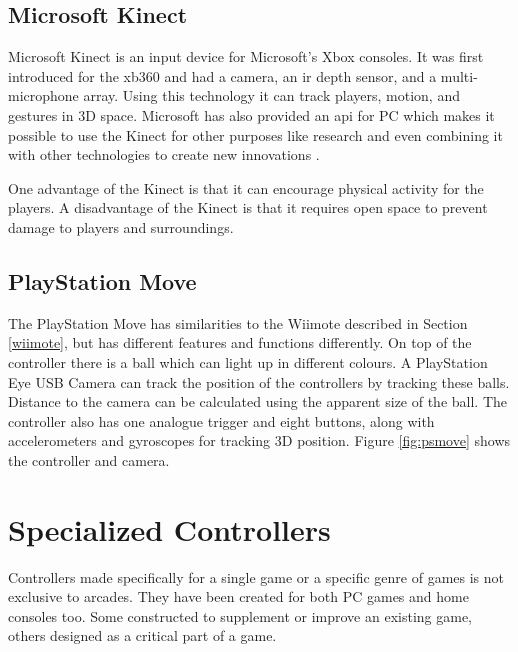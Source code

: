 \subsection{Microsoft Kinect}
Microsoft Kinect is an input device for Microsoft's Xbox consoles.
It was first introduced for the \gls{xb360} and had a camera, an \gls{ir} depth sensor, and a multi-microphone array. %
Using this technology it can track players, motion, and gestures in 3D space. %
Microsoft has also provided an \gls{api} for PC which makes it possible to use the Kinect for other purposes like research and even combining it with other technologies to create new innovations \cite{2015kinect}.


One advantage of the Kinect is that it can encourage physical activity for the players.
A disadvantage of the Kinect is that it requires open space to prevent damage to players and surroundings.

\subsection{PlayStation Move}
\label{sec:psmove}
The PlayStation Move has similarities to the Wiimote described in Section \ref{wiimote}, but has different features and functions differently.
On top of the controller there is a ball which can light up in different colours.
A PlayStation Eye USB Camera can track the position of the controllers by tracking these balls.
Distance to the camera can be calculated using the apparent size of the ball.
The controller also has one analogue trigger and eight buttons, along with accelerometers and gyroscopes for tracking 3D position.
Figure \ref{fig:psmove} shows the controller and camera.


\section{Specialized Controllers}
Controllers made specifically for a single game or a specific genre of games is not exclusive to arcades.
They have been created for both PC games and home consoles too.
Some constructed to supplement or improve an existing game, others designed as a critical part of a game.

